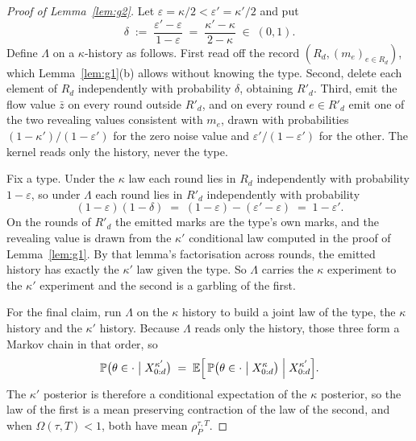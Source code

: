 \begin{proof}[Proof of Lemma~\ref{lem:g2}]
Let $\varepsilon = \kappa/2 < \varepsilon' = \kappa'/2$ and put
\[
\delta \;:=\; \frac{\varepsilon' - \varepsilon}{1-\varepsilon}
\;=\; \frac{\kappa' - \kappa}{2 - \kappa} \;\in\;(0,1).
\]
Define $\Lambda$ on a $\kappa$-history as follows. First read off the record
$(R_d, (m_e)_{e \in R_d})$, which Lemma~\ref{lem:g1}(b) allows without knowing the type. Second,
delete each element of $R_d$ independently with probability $\delta$, obtaining $R'_d$. Third,
emit the flow value $\bar z$ on every round outside $R'_d$, and on every round $e \in R'_d$ emit
one of the two revealing values consistent with $m_e$, drawn with probabilities
$(1-\kappa')/(1-\varepsilon')$ for the zero noise value and $\varepsilon'/(1-\varepsilon')$ for
the other. The kernel reads only the history, never the type.

Fix a type. Under the $\kappa$ law each round lies in $R_d$ independently with probability
$1-\varepsilon$, so under $\Lambda$ each round lies in $R'_d$ independently with probability
\[
(1-\varepsilon)(1-\delta) \;=\; (1-\varepsilon) - (\varepsilon'-\varepsilon)
\;=\; 1-\varepsilon' .
\]
On the rounds of $R'_d$ the emitted marks are the type's own marks, and the revealing value is
drawn from the $\kappa'$ conditional law computed in the proof of Lemma~\ref{lem:g1}. By that
lemma's factorisation across rounds, the emitted history has exactly the $\kappa'$ law given the
type. So $\Lambda$ carries the $\kappa$ experiment to the $\kappa'$ experiment and the second is
a garbling of the first.

For the final claim, run $\Lambda$ on the $\kappa$ history to build a joint law of the type, the
$\kappa$ history and the $\kappa'$ history. Because $\Lambda$ reads only the history, those three
form a Markov chain in that order, so
\[
\mathbb{P}\bigl(\theta \in \cdot \bigm| X^{\kappa'}_{0:d}\bigr)
\;=\; \mathbb{E}\Bigl[\,\mathbb{P}\bigl(\theta \in \cdot \bigm| X^{\kappa}_{0:d}\bigr)
\Bigm| X^{\kappa'}_{0:d}\Bigr].
\]
The $\kappa'$ posterior is therefore a conditional expectation of the $\kappa$ posterior, so the
law of the first is a mean preserving contraction of the law of the second, and when
$\Omega(\tau,T) < 1$, both have mean $\rho_P^{\tau,T}$.
\end{proof}

